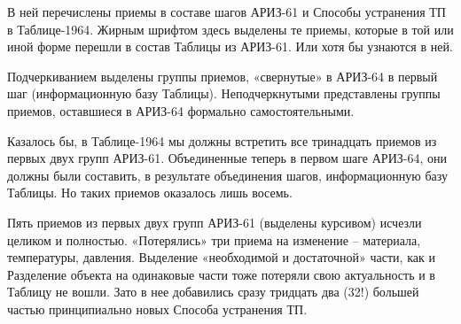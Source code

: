\documentclass[11pt,a4paper]{article}
\begin{document}
В ней перечислены приемы в составе шагов АРИЗ-61 и Способы устранения ТП в
Таблице-1964. Жирным шрифтом здесь выделены те приемы, которые в той или иной
форме перешли в состав Таблицы из АРИЗ-61. Или хотя бы узнаются в ней.

Подчеркиванием выделены группы приемов, «свернутые» в АРИЗ-64 в первый шаг
(информационную базу Таблицы). Неподчеркнутыми представлены группы приемов,
оставшиеся в АРИЗ-64 формально самостоятельными.

Казалось бы, в Таблице-1964 мы должны встретить все тринадцать приемов из
первых двух групп АРИЗ-61. Объединенные теперь в первом шаге АРИЗ-64, они
должны были составить, в результате объединения шагов, информационную базу
Таблицы. Но таких приемов оказалось лишь восемь.

Пять приемов из первых двух групп АРИЗ-61 (выделены курсивом) исчезли целиком
и полностью. «Потерялись» три приема на изменение -- материала, температуры,
давления. Выделение «необходимой и достаточной» части, как и Разделение
объекта на одинаковые части тоже потеряли свою актуальность и в Таблицу не
вошли. Зато в нее добавились сразу тридцать два (32!) большей частью
принципиально новых Способа устранения ТП.
\end{document}

